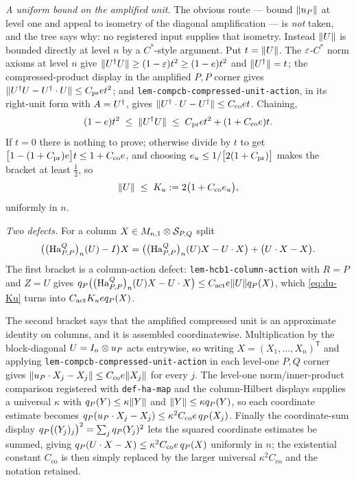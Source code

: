 \emph{A uniform bound on the amplified unit.} The obvious route --- bound $\lVert u_{P}\rVert$
at level one and appeal to isometry of the diagonal amplification --- is \emph{not} taken,
and the tree says why: no registered input supplies that isometry. Instead $\lVert U\rVert$ is
bounded directly at level $n$ by a $C^*$-style argument. Put $t=\lVert U\rVert$. The
$\varepsilon$-$C^*$ norm axioms at level $n$ give $\lVert U^{\dagger} U\rVert\ge(1-\varepsilon)t^{2}\ge(1-e)t^{2}$
and $\lVert U^{\dagger}\rVert=t$; the compressed-product display in the amplified $P,P$ corner gives
$\lVert U^{\dagger} U-U^{\dagger}\mathbin{\cdot} U\rVert\le C_{\mathrm{pr}}e t^{2}$; and
\texttt{lem-compcb-compressed-unit-action}, in its right-unit form with $A=U^{\dagger}$, gives
$\lVert U^{\dagger}\mathbin{\cdot} U-U^{\dagger}\rVert\le C_{\mathrm{co}}e t$. Chaining,
\[
  (1-e)t^{2}\;\le\;\lVert U^{\dagger} U\rVert\;\le\;C_{\mathrm{pr}}e t^{2}+(1+C_{\mathrm{co}}e)t .
\]
If $t=0$ there is nothing to prove; otherwise divide by $t$ to get
$\bigl[1-(1+C_{\mathrm{pr}})e\bigr]t\le1+C_{\mathrm{co}}e$, and choosing
$e_u\le1/\bigl[2(1+C_{\mathrm{pr}})\bigr]$ makes the bracket at least $\tfrac12$, so
\begin{equation}\label{eq:du-Ku}
  \lVert U\rVert\;\le\;K_u:=2\bigl(1+C_{\mathrm{co}}e_u\bigr),
\end{equation}
uniformly in $n$.

\emph{Two defects.} For a column $X\in M_{n,1}\otimes\mathcal S_{P,Q}$ split
\begin{equation}\label{eq:du-split}
  \bigl(\bigl(\mathrm{Ha}^{Q}_{P,P}\bigr)_{n}(U)-I\bigr)X
  =\bigl(\bigl(\mathrm{Ha}^{Q}_{P,P}\bigr)_{n}(U)X-U\mathbin{\cdot} X\bigr)+\bigl(U\mathbin{\cdot} X-X\bigr).
\end{equation}
The first bracket is a column-action defect: \texttt{lem-hcb1-column-action} with $R=P$
and $Z=U$ gives $q_{P}\bigl(\bigl(\mathrm{Ha}^{Q}_{P,P}\bigr)_{n}(U)X-U\mathbin{\cdot} X\bigr)\le C_{\mathrm{act}}e\lVert U\rVert q_{P}(X)$,
which \eqref{eq:du-Ku} turns into $C_{\mathrm{act}}K_ueq_{P}(X)$.

The second bracket says that the amplified compressed unit is an approximate identity on
columns, and it is assembled coordinatewise. Multiplication by the block-diagonal
$U=I_{n}\otimes u_{P}$ acts entrywise, so writing $X=(X_1,\dots,X_n)^{\mathsf T}$ and
applying \texttt{lem-compcb-compressed-unit-action} in each level-one $P,Q$ corner gives
$\lVert u_{P}\mathbin{\cdot} X_j-X_j\rVert\le C_{\mathrm{co}}e\lVert X_j\rVert$ for every $j$. The level-one
norm/inner-product comparison registered with \texttt{def-ha-map} and the column-Hilbert
displays supplies a universal $\kappa$ with $q_{P}(Y)\le\kappa\lVert Y\rVert$ and
$\lVert Y\rVert\le\kappa q_{P}(Y)$, so each coordinate estimate becomes
$q_{P}(u_{P}\mathbin{\cdot} X_j-X_j)\le\kappa^{2}C_{\mathrm{co}}e\,q_{P}(X_j)$. Finally
the coordinate-sum display $q_{P}\bigl((Y_j)_j\bigr)^{2}=\sum_jq_{P}(Y_j)^{2}$ lets
the squared coordinate estimates be summed, giving
$q_{P}(U\mathbin{\cdot} X-X)\le\kappa^{2}C_{\mathrm{co}}e\,q_{P}(X)$ uniformly in $n$; the
existential constant $C_{\mathrm{co}}$ is then simply replaced by the larger universal
$\kappa^{2}C_{\mathrm{co}}$ and the notation retained.

